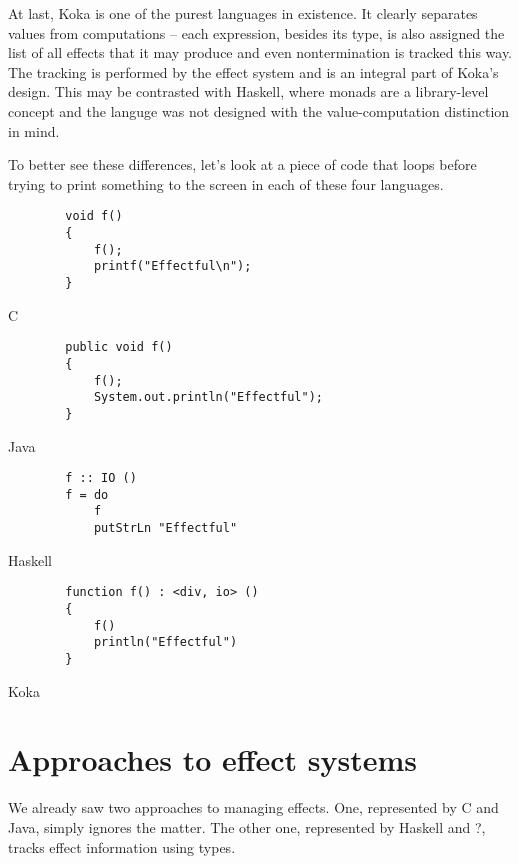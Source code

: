 \documentclass[declaration,inz,english,shortabstract]{iithesis}
\begin{document}
At last, Koka \cite{Koka} is one of the purest languages in existence. It clearly separates values from computations -- each expression, besides its type, is also assigned the list of all effects that it may produce and even nontermination is tracked this way. The tracking is performed by the effect system and is an integral part of Koka's design. This may be contrasted with Haskell, where monads are a library-level concept and the languge was not designed with the value-computation distinction in mind.

To better see these differences, let's look at a piece of code that loops before trying to print something to the screen in each of these four languages.

\begin{listing}[H]
    \begin{verbatim}
        void f()
        {
            f();
            printf("Effectful\n");
        }
    \end{verbatim}
    \caption{C}
\end{listing}

\begin{listing}[H]
    \begin{verbatim}
        public void f()
        {
            f();
            System.out.println("Effectful");
        }
    \end{verbatim}
    \caption{Java}
\end{listing}

\begin{listing}[H]
    \begin{verbatim}
        f :: IO ()
        f = do
            f
            putStrLn "Effectful"
    \end{verbatim}
    \caption{Haskell}
\end{listing}

\begin{listing}[H]
    \begin{verbatim}
        function f() : <div, io> ()
        {
            f()
            println("Effectful")
        }
    \end{verbatim}
    \caption{Koka}
\end{listing}

\section{Approaches to effect systems}

We already saw two approaches to managing effects. One, represented by C and Java, simply ignores the matter. The other one, represented by Haskell and ?, tracks effect information using types.
\end{document}
